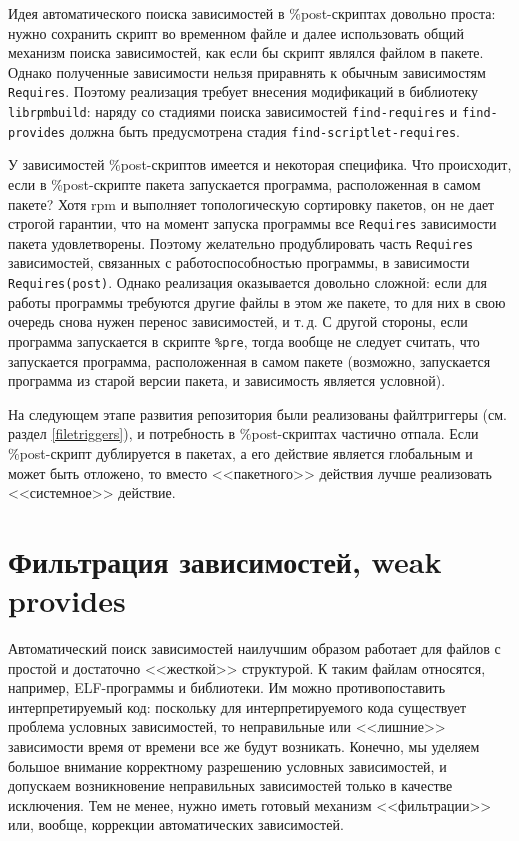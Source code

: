 \documentclass[russian,a4paper,12pt,titlepage]{article}
\begin{document}
Идея автоматического поиска зависимостей в \%post-скриптах довольно проста: нужно сохранить
скрипт во временном файле и далее использовать общий механизм поиска зависимостей, как если бы скрипт
являлся файлом в пакете.  Однако полученные зависимости нельзя приравнять к обычным зависимостям \verb|Requires|.
Поэтому реализация требует внесения модификаций в библиотеку \verb|librpmbuild|:
наряду со стадиями поиска зависимостей \verb|find-requires| и \verb|find-provides| должна быть предусмотрена
стадия \verb|find-scriptlet-requires|.

У зависимостей \%post-скриптов имеется и некоторая специфика.  Что происходит, если в \%post-скрипте пакета
запускается программа, расположенная в самом пакете?  Хотя rpm и выполняет топологическую сортировку пакетов,
он не дает строгой гарантии, что на момент запуска программы все \verb|Requires| зависимости пакета удовлетворены.
Поэтому желательно продублировать часть \verb|Requires| зависимостей, связанных с работоспособностью программы,
в зависимости \verb|Requires(post)|.  Однако реализация оказывается довольно сложной: если для работы программы
требуются другие файлы в этом же пакете, то для них в свою очередь снова нужен перенос зависимостей, и т.\,д.
С другой стороны, если программа запускается в скрипте \verb|%pre|, тогда вообще не следует считать, что
запускается программа, расположенная в самом пакете (возможно, запускается программа из старой версии пакета,
и зависимость является условной).

На следующем этапе развития репозитория были реализованы файлтриггеры (см. раздел \ref{filetriggers}),
и потребность в \%post-скриптах частично отпала.  Если \%post-скрипт дублируется в пакетах, а его действие
является глобальным и может быть отложено, то вместо <<пакетного>> действия лучше реализовать <<системное>> действие.

\section{Фильтрация зависимостей, weak provides}
\label{filter-deps}
Автоматический поиск зависимостей наилучшим образом работает для файлов с простой и достаточно <<жесткой>> структурой.
К таким файлам относятся, например, ELF-программы и библиотеки.  Им можно противопоставить интерпретируемый код:
поскольку для интерпретируемого кода существует проблема условных зависимостей, то неправильные или <<лишние>>
зависимости время от времени все же будут возникать.  Конечно, мы уделяем большое внимание корректному разрешению
условных зависимостей, и допускаем возникновение неправильных зависимостей только в качестве исключения.  Тем не менее,
нужно иметь готовый механизм <<фильтрации>> или, вообще, коррекции автоматических зависимостей.
\end{document}
